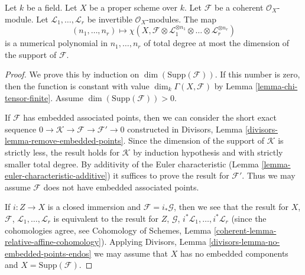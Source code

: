 \begin{lemma}
\label{lemma-numerical-polynomial-from-euler}
Let $k$ be a field. Let $X$ be a proper scheme over $k$. Let $\mathcal{F}$
be a coherent $\mathcal{O}_X$-module. Let
$\mathcal{L}_1, \ldots, \mathcal{L}_r$ be invertible $\mathcal{O}_X$-modules.
The map
$$
(n_1, \ldots, n_r) \longmapsto
\chi(X, \mathcal{F} \otimes
\mathcal{L}_1^{\otimes n_1} \otimes \ldots \otimes
\mathcal{L}_r^{\otimes n_r})
$$
is a numerical polynomial in $n_1, \ldots, n_r$ of total degree at
most the dimension of the support of $\mathcal{F}$.
\end{lemma}

\begin{proof}
We prove this by induction on $\dim(\text{Supp}(\mathcal{F}))$.
If this number is zero, then the function is constant with value
$\dim_k \Gamma(X, \mathcal{F})$ by Lemma \ref{lemma-chi-tensor-finite}.
Assume $\dim(\text{Supp}(\mathcal{F})) > 0$.

\medskip\noindent
If $\mathcal{F}$ has embedded associated points, then we can consider
the short exact sequence
$0 \to \mathcal{K} \to \mathcal{F} \to \mathcal{F}' \to 0$
constructed in Divisors, Lemma \ref{divisors-lemma-remove-embedded-points}.
Since the dimension of the support of $\mathcal{K}$ is strictly less,
the result holds for $\mathcal{K}$ by induction hypothesis and with
strictly smaller total degree.
By additivity of the Euler characteristic
(Lemma \ref{lemma-euler-characteristic-additive})
it suffices to prove the result for $\mathcal{F}'$. Thus we may assume
$\mathcal{F}$ does not have embedded associated points.

\medskip\noindent
If $i : Z \to X$ is a closed immersion and $\mathcal{F} = i_*\mathcal{G}$,
then we see that the result for $X$, $\mathcal{F}$,
$\mathcal{L}_1, \ldots, \mathcal{L}_r$ is equivalent to the result
for $Z$, $\mathcal{G}$, $i^*\mathcal{L}_1, \ldots, i^*\mathcal{L}_r$
(since the cohomologies agree, see
Cohomology of Schemes, Lemma \ref{coherent-lemma-relative-affine-cohomology}).
Applying Divisors, Lemma \ref{divisors-lemma-no-embedded-points-endos}
we may assume that $X$ has no embedded components and
$X = \text{Supp}(\mathcal{F})$.


\end{proof}
